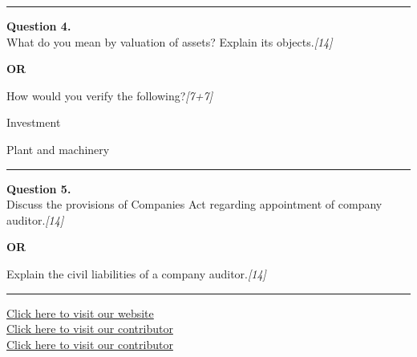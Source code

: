 \documentclass[11pt,a4paper]{article}
\newcommand{\pts}[1]{\hfill   \textit{[#1]}}
\begin{document}
\medskip\rule{\linewidth}{0.2pt}




\noindent   \textbf{Question 4.} \\
What do you mean by valuation of assets? Explain its objects.\pts{14}

\centerline{   \textbf{OR}}

How would you verify the following?\pts{7+7}

\begin{parts}
  \item Investment
  \item Plant and machinery
\end{parts}

\medskip\rule{\linewidth}{0.2pt}




\noindent   \textbf{Question 5.} \\
Discuss the provisions of Companies Act regarding appointment of company auditor.\pts{14}

\centerline{   \textbf{OR}}

Explain the civil liabilities of a company auditor.\pts{14}

\vfill
\rule{\linewidth}{0.4pt}

\begin{center}\small
\href{https://bhu-exam.vercel.app/}{Click here to visit our website}\\[4pt]
\href{https://me-aryan.vercel.app/}{Click here to visit our contributor}\\[4pt]
\href{https://quashan-me.vercel.app/}{Click here to visit our contributor}
\end{center}
\end{document}
